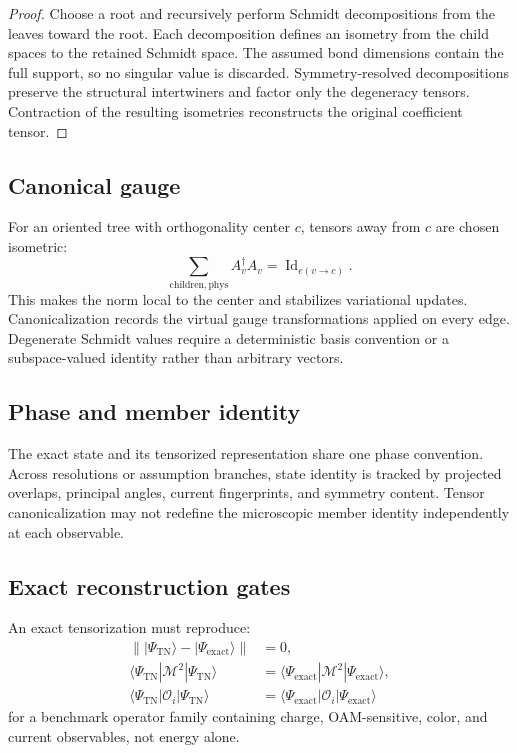 \documentclass[11pt]{article}
\newcommand{\Id}{\operatorname{Id}}
\newcommand{\TN}{\ensuremath{\mathrm{TN}}}
\newcommand{\cO}{\mathcal O}
\newcommand{\cM}{\mathcal M}
\newcommand{\norm}[1]{\left\lVert#1\right\rVert}
\begin{document}
\begin{proof}
Choose a root and recursively perform Schmidt decompositions from the leaves
toward the root.  Each decomposition defines an isometry from the child spaces
to the retained Schmidt space.  The assumed bond dimensions contain the full
support, so no singular value is discarded.  Symmetry-resolved decompositions
preserve the structural intertwiners and factor only the degeneracy tensors.
Contraction of the resulting isometries reconstructs the original coefficient
tensor.
\end{proof}

\subsection{Canonical gauge}

For an oriented tree with orthogonality center \(c\), tensors away from \(c\)
are chosen isometric:
\begin{equation}
 \sum_{\mathrm{children},\mathrm{phys}}
 A_v^{\dagger}A_v=\Id_{e(v\to c)}.
\label{eq:tree-isometry}
\end{equation}
This makes the norm local to the center and stabilizes variational updates.
Canonicalization records the virtual gauge transformations applied on every
edge.  Degenerate Schmidt values require a deterministic basis convention or
a subspace-valued identity rather than arbitrary vectors.

\subsection{Phase and member identity}

The exact state and its tensorized representation share one phase convention.
Across resolutions or assumption branches, state identity is tracked by
projected overlaps, principal angles, current fingerprints, and symmetry
content.  Tensor canonicalization may not redefine the microscopic member
identity independently at each observable.

\subsection{Exact reconstruction gates}

An exact tensorization must reproduce:
\begin{equation}
 \begin{aligned}
 \norm{|\Psi_{\TN}\rangle-|\Psi_{\mathrm{exact}}\rangle}&=0,\\
 \langle\Psi_{\TN}|\cM^2|\Psi_{\TN}\rangle
 &=\langle\Psi_{\mathrm{exact}}|\cM^2|\Psi_{\mathrm{exact}}\rangle,\\
 \langle\Psi_{\TN}|\cO_i|\Psi_{\TN}\rangle
 &=\langle\Psi_{\mathrm{exact}}|\cO_i|\Psi_{\mathrm{exact}}\rangle
 \end{aligned}
\label{eq:exact-tn-gates}
\end{equation}
for a benchmark operator family containing charge, OAM-sensitive, color, and
current observables, not energy alone.
\end{document}
